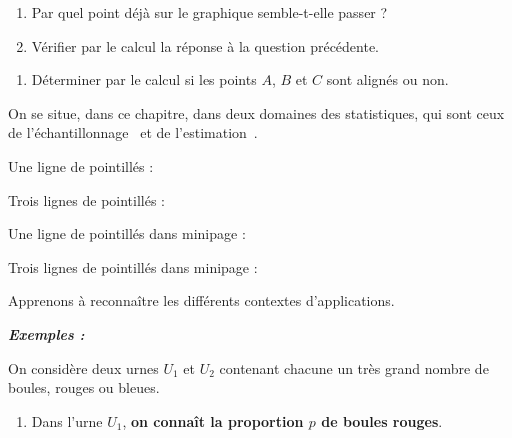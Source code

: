 \documentclass[12pt,french]{article}
\begin{document}
\begin{spacing}{1.2}
\begin{minipage}{0.35\linewidth}
\begin{enumerate}[label=\arabic*.,font=\color{blue} \bfseries]
\begin{enumerate}[label=\alph*),font=\color{blue} \bfseries]
	\end{enumerate}

\end{enumerate}

\end{minipage}
	\begin{enumerate}[label=\alph*),start=2,leftmargin=1.5cm,font=\color{blue} \bfseries]
	\item Par quel point déjà sur le graphique semble-t-elle passer ?
	\item Vérifier par le calcul la réponse à la question précédente.
	\end{enumerate}
\begin{enumerate}[label=\arabic*.,resume,font=\color{blue} \bfseries]
\item Déterminer par le calcul si les points $A$, $B$ et $C$ sont alignés ou non.

\end{enumerate}

On se situe, dans ce chapitre, dans deux domaines des statistiques, qui sont ceux de \og l'échantillonnage\fg~ et de \og l'estimation\fg~.

Une ligne de pointillés :

\Pointilles

Trois lignes de pointillés :

\Pointilles[3]

\begin{minipage}{0.45\linewidth}

Une ligne de pointillés dans minipage :
\Pointilles

\end{minipage}
\hfill
\begin{minipage}{0.45\linewidth}

Trois lignes de pointillés dans minipage :
\Pointilles[3]

\end{minipage}

Apprenons à reconnaître les différents contextes d'applications.

\medskip


\textbf{\textit{Exemples :}}

On considère deux urnes $U_1$ et $U_2$ contenant chacune un très grand nombre de boules, rouges ou bleues.

\begin{enumerate}
\item 
Dans l'urne $U_1$, \textbf{on connaît la proportion $p$ de boules rouges}.


\end{enumerate}
\end{spacing}
\end{document}
